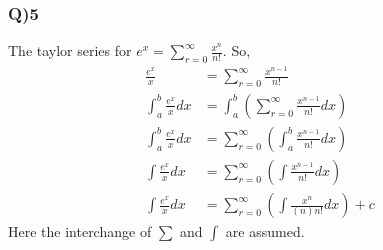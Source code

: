 \documentclass[11pt]{beamer}
\begin{document}
\begin{frame}
\frametitle{Q)5}
The taylor series for $e^x=\sum_{r=0}^{\infty}\frac{x^n}{n!}$. So,
\begin{align*}
\frac{e^x}{x}&= \sum_{r=0}^{\infty}\frac{x^{n-1}}{n!}\\
\int_{a}^{b} \frac{e^x}{x}dx&=\int_{a}^{b} \left( \sum_{r=0}^{\infty}\frac{x^{n-1}}{n!}dx\right)\\
\int_{a}^{b} \frac{e^x}{x}dx&=\sum_{r=0}^{\infty}\left(\int_{a}^{b} \frac{x^{n-1}}{n!}dx\right)\\
\int \frac{e^x}{x}dx&=\sum_{r=0}^{\infty}\left(\int\frac{x^{n-1}}{n!}dx\right)\\
\int \frac{e^x}{x}dx&=\sum_{r=0}^{\infty}\left(\int\frac{x^{n}}{(n)n!}dx\right)+c
\end{align*}
Here the interchange of $\sum$ and $\int$ are assumed.
\end{frame}
\end{document}
